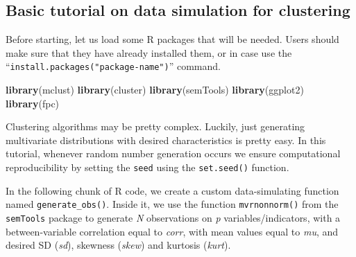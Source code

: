 \documentclass[
  man,floatsintext]{apa7}
\newenvironment{Shaded}{\begin{snugshade}}{\end{snugshade}}
\newcommand{\FunctionTok}[1]{\textcolor[rgb]{0.13,0.29,0.53}{\textbf{#1}}}
\newcommand{\NormalTok}[1]{#1}
\begin{document}
\hypertarget{basic-tutorial-on-data-simulation-for-clustering}{%
\subsection{Basic tutorial on data simulation for clustering}\label{basic-tutorial-on-data-simulation-for-clustering}}

Before starting, let us load some R packages that will be needed. Users should make sure that they have already installed them, or in case use the ``\texttt{install.packages("package-name")}'' command.

\begin{Shaded}
\begin{Highlighting}[]
\FunctionTok{library}\NormalTok{(mclust)}
\FunctionTok{library}\NormalTok{(cluster)}
\FunctionTok{library}\NormalTok{(semTools)}
\FunctionTok{library}\NormalTok{(ggplot2)}
\FunctionTok{library}\NormalTok{(fpc)}
\end{Highlighting}
\end{Shaded}

Clustering algorithms may be pretty complex. Luckily, just generating multivariate distributions with desired characteristics is pretty easy. In this tutorial, whenever random number generation occurs we ensure computational reproducibility by setting the \texttt{seed} using the \texttt{set.seed()} function.

In the following chunk of R code, we create a custom data-simulating function named \texttt{generate\_obs()}. Inside it, we use the function \texttt{mvrnonnorm()} from the \texttt{semTools} package to generate \emph{N} observations on \emph{p} variables/indicators, with a between-variable correlation equal to \emph{corr}, with mean values equal to \emph{mu}, and desired SD (\emph{sd}), skewness (\emph{skew}) and kurtosis (\emph{kurt}).
\end{document}
